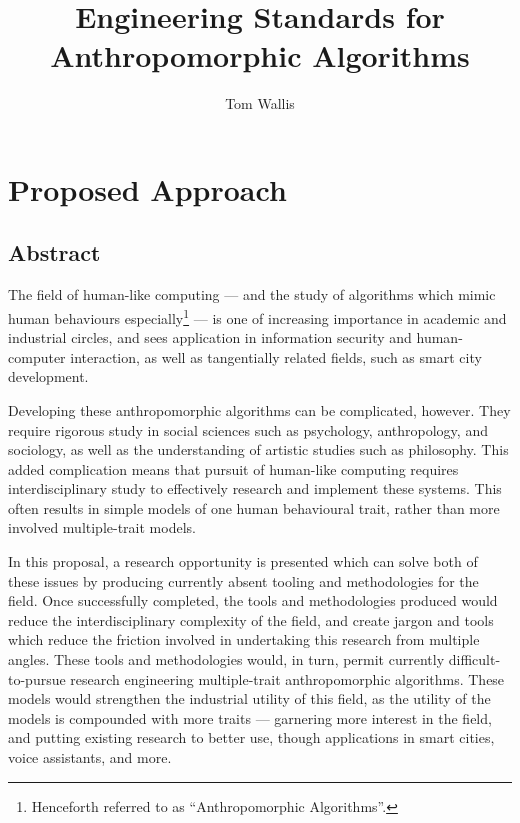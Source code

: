 

\title{Engineering Standards for Anthropomorphic Algorithms}
\author{Tom Wallis}
\date{}
\maketitle


\section{Proposed Approach}
\label{sec:proposed_approach}
\subsection{Abstract}\label{sec:abstract}
The field of human-like computing --- and the study of algorithms which mimic human behaviours especially\footnote{Henceforth referred to as ``Anthropomorphic Algorithms''.} --- is one of increasing importance in academic and industrial circles, and sees application in information security and human-computer interaction, as well as tangentially related fields, such as smart city development.\par

Developing these anthropomorphic algorithms can be complicated, however. They require rigorous study in social sciences such as psychology, anthropology, and sociology, as well as the understanding of artistic studies such as philosophy. This added complication means that pursuit of human-like computing requires interdisciplinary study to effectively research and implement these systems. This often results in simple models of one human behavioural trait, rather than more involved multiple-trait models.\par

% 
In this proposal, a research opportunity is presented which can solve both of these issues by producing currently absent tooling and methodologies for the field. Once successfully completed, the tools and methodologies produced would reduce the interdisciplinary complexity of the field, and create jargon and tools which reduce the friction involved in undertaking this research from multiple angles. These tools and methodologies would, in turn, permit currently difficult-to-pursue research engineering multiple-trait anthropomorphic algorithms. These models would strengthen the industrial utility of this field, as the utility of the models is compounded with more traits --- garnering more interest in the field, and putting existing research to better use, though applications in smart cities, voice assistants, and more.\par

